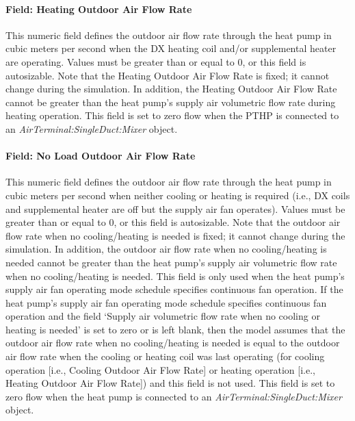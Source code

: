 \paragraph{Field: Heating Outdoor Air Flow Rate}\label{field-heating-outdoor-air-flow-rate-1}

This numeric field defines the outdoor air flow rate through the heat pump in cubic meters per second when the DX heating coil and/or supplemental heater are operating. Values must be greater than or equal to 0, or this field is autosizable. Note that the Heating Outdoor Air Flow Rate is fixed; it cannot change during the simulation. In addition, the Heating Outdoor Air Flow Rate cannot be greater than the heat pump's supply air volumetric flow rate during heating operation. This field is set to zero flow when the PTHP is connected to an \textit{AirTerminal:SingleDuct:Mixer} object.

\paragraph{Field: No Load Outdoor Air Flow Rate}\label{field-no-load-outdoor-air-flow-rate-1}

This numeric field defines the outdoor air flow rate through the heat pump in cubic meters per second when neither cooling or heating is required (i.e., DX coils and supplemental heater are off but the supply air fan operates). Values must be greater than or equal to 0, or this field is autosizable. Note that the outdoor air flow rate when no cooling/heating is needed is fixed; it cannot change during the simulation. In addition, the outdoor air flow rate when no cooling/heating is needed cannot be greater than the heat pump's supply air volumetric flow rate when no cooling/heating is needed. This field is only used when the heat pump's supply air fan operating mode schedule specifies continuous fan operation. If the heat pump's supply air fan operating mode schedule specifies continuous fan operation and the field `Supply air volumetric flow rate when no cooling or heating is needed' is set to zero or is left blank, then the model assumes that the outdoor air flow rate when no cooling/heating is needed is equal to the outdoor air flow rate when the cooling or heating coil was last operating (for cooling operation {[}i.e., Cooling Outdoor Air Flow Rate{]} or heating operation {[}i.e., Heating Outdoor Air Flow Rate{]}) and this field is not used. This field is set to zero flow when the heat pump is connected to an \textit{AirTerminal:SingleDuct:Mixer} object.

